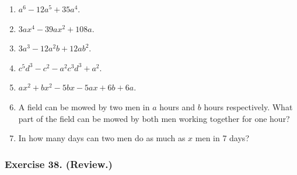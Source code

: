 \documentclass{book}
\begin{document}
\begin{enumerate}
\item $a^6-12a^5+35a^4$.

\item $3ax^4-39ax^2+108a$.

\item $3a^3-12a^2b+12ab^2$.

\item $c^5d^3-c^2-a^2c^3d^3+a^2$.

\item $ax^2+bx^2-5bx-5ax+6b+6a$.

\item A field can be mowed by two men in $a$ hours and $b$ hours
respectively. What part of the field can be mowed by both men
working together for one hour?

\item In how many days can two men do as much as $x$ men in 7
days?
\end{enumerate}

\subsubsection*{Exercise 38. (Review.)}
\end{document}
